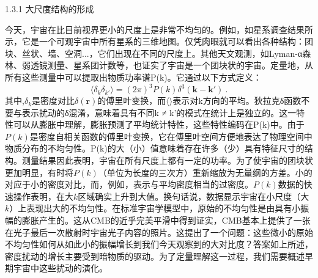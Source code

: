 

1.3.1 大尺度结构的形成

今天，宇宙在比目前视界更小的尺度上是非常不均匀的。例如，如星系调查结果所示，它是一个可观宇宙中所有星系的三维地图。仅凭肉眼就可以看出各种结构：团块、丝状、墙、空洞...，它们出现在不同的尺度上。其他天文观测，如Lyman-α森林、弱透镜测量、星系团计数等，也证实了宇宙是一个团块状的宇宙。定量地，从所有这些测量中可以提取出物质功率谱P(k)。它通过以下方式定义：
\begin{equation}
\langle \delta_k \delta_{k'} \rangle = (2\pi)^3 P(k) \delta^3(\mathbf k - \mathbf k')~.
\end{equation}
其中,$\delta_k$是密度对比$\delta(\mathbf r)$的傅里叶变换，而$\langle\rangle$表示对k方向的平均。狄拉克δ函数不要与表示扰动的δ混淆，意味着具有不同k ≠ k'的模式在统计上是独立的。这一特性可以从膨胀中理解，膨胀预测了平均统计特性，这些特性编码在P(k)中。由于$P(k)$是密度自相关函数的傅里叶变换，它在傅里叶空间方便地表达了物理空间中物质分布的不均匀性。P(k)的大（小）值意味着存在许多（少）具有特征尺寸的结构。测量结果因此表明，宇宙在所有尺度上都有一定的功率。为了使宇宙的团块状更加明显，有时将$P(k)$（单位为长度的三次方）重新缩放为无量纲的方差。小的对应于小的密度对比，而，例如，表示与平均密度相当的过密度。$P(k)$数据的快速操作表明，在大$k$区域确实上升到大值。换句话说，数据显示宇宙在小尺度（大$k$）上表现出大的不均匀性。在标准宇宙学模型中，原始的不均匀性是由具有小振幅的膨胀产生的。这从CMB的近乎完美平滑中得到证实，CMB基本上提供了一张在光子最后一次散射时宇宙光子内容的照片。这提出了一个问题：这些微小的原始不均匀性如何从如此小的振幅增长到我们今天观察到的大对比度？答案如上所述，密度扰动的增长主要受到暗物质的驱动。为了定量理解这一过程，我们需要概述早期宇宙中这些扰动的演化。

